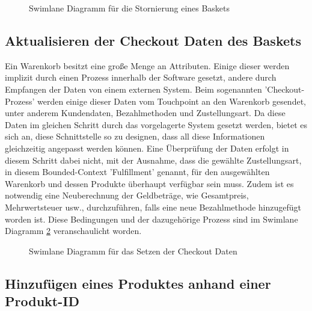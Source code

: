 \begin{figure}[htbp]
	\centering
	
	\caption{Swimlane Diagramm für die Stornierung eines Baskets}
	\label{fig:SL-Basketstornierung}
\end{figure}

\subsection{Aktualisieren der Checkout Daten des Baskets}

Ein Warenkorb besitzt eine große Menge an Attributen. Einige dieser werden implizit durch einen Prozess innerhalb der Software gesetzt, andere durch Empfangen der Daten von einem externen System. Beim sogenannten 'Checkout-Prozess' werden einige dieser Daten vom Touchpoint an den Warenkorb gesendet, unter anderem Kundendaten, Bezahlmethoden und Zustellungsart. Da diese Daten im gleichen Schritt durch das vorgelagerte System gesetzt werden, bietet es sich an, diese Schnittstelle so zu designen, dass all diese Informationen gleichzeitig angepasst werden können. Eine Überprüfung der Daten erfolgt in diesem Schritt dabei nicht, mit der Ausnahme, dass die gewählte Zustellungsart, in diesem Bounded-Context 'Fulfillment' genannt, für den ausgewählten Warenkorb und dessen Produkte überhaupt verfügbar sein muss. Zudem ist es notwendig eine Neuberechnung der Geldbeträge, wie Gesamtpreis, Mehrwertsteuer usw., durchzuführen, falls eine neue Bezahlmethode hinzugefügt worden ist. Diese Bedingungen und der dazugehörige Prozess sind im Swimlane Diagramm \ref{fig:SL-Checkoutdata} veranschaulicht worden.

\begin{figure}[htbp]
	\centering
	
	\caption{Swimlane Diagramm für das Setzen der Checkout Daten}
	\label{fig:SL-Checkoutdata}
\end{figure}

\subsection{Hinzufügen eines Produktes anhand einer Produkt-ID}

